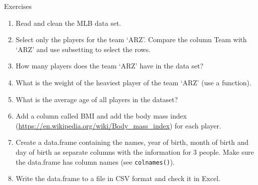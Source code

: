 \documentclass[
  9pt,
  ignorenonframetext,
]{beamer}
\providecommand{\tightlist}{%
  \setlength{\itemsep}{0pt}\setlength{\parskip}{0pt}}
\begin{document}
\begin{frame}[fragile]{Exercises}
\protect\hypertarget{exercises-1}{}
\begin{enumerate}
\tightlist
\item
  Read and clean the MLB data set.
\item
  Select only the players for the team `ARZ'. Compare the column Team
  with `ARZ' and use subsetting to select the rows.
\item
  How many players does the team `ARZ' have in the data set?
\item
  What is the weight of the heaviest player of the team `ARZ' (use a
  function).
\item
  What is the average age of all players in the dataset?
\item
  Add a column called BMI and add the body mass index
  (\url{https://en.wikipedia.org/wiki/Body_mass_index}) for each player.
\item
  Create a data.frame containing the names, year of birth, month of
  birth and day of birth as separate columns with the information for 3
  people. Make sure the data.frame has column names (see
  \texttt{colnames()}).
\item
  Write the data.frame to a file in CSV format and check it in Excel.
\end{enumerate}
\end{frame}
\end{document}
